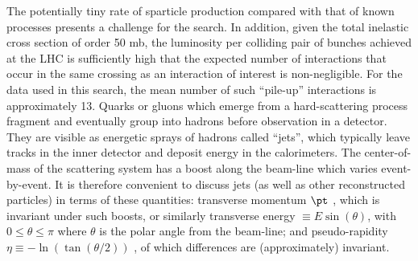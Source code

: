 The potentially tiny rate of sparticle production compared with that
of known processes presents a challenge for the search. In addition, given the total
inelastic cross section of order 50 mb, the luminosity per colliding pair of bunches
achieved at the LHC is suﬃciently high that the expected number of interactions that
occur in the same crossing as an interaction of interest is non-negligible. For the data
used in this search, the mean number of such “pile-up” interactions is approximately
13. Quarks or gluons which emerge from a hard-scattering process fragment and eventually 
group into hadrons before observation in a detector. They are visible as energetic
sprays of hadrons called “jets”, which typically leave tracks in the inner detector
and deposit energy in the calorimeters. The center-of-mass of the scattering system
has a boost along the beam-line which varies event-by-event. It is therefore convenient
to discuss jets (as well as other reconstructed particles) in terms of these quantities:
transverse momentum $\pt$ , which is invariant under such boosts, or similarly transverse
energy $\equiv E \sin\left(\theta\right)$, with $0 \leq \theta \leq \pi$ where $\theta$
is the polar angle from the beam-line; and pseudo-rapidity $\eta \equiv −\ln\left( \tan\left(\theta/2\right)\right)$
, of which differences are (approximately) invariant.


